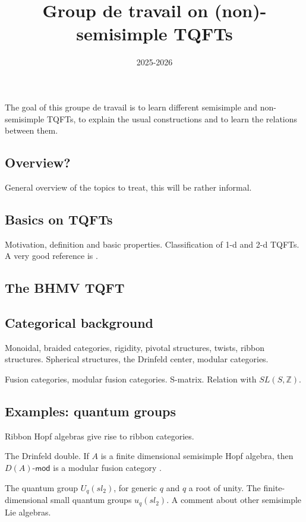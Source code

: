 \documentclass{article}
\title{Group de travail on (non)-semisimple TQFTs}
\date{2025-2026}
\begin{document}
\maketitle

The goal of this groupe de travail is to learn different semisimple and non-semisimple TQFTs, to explain the usual constructions and to learn the  relations between them.


\subsection{Overview?}

General overview of the topics to treat, this will be rather informal.


\subsection{Basics on TQFTs}

Motivation, definition and basic properties. Classification of 1-d and 2-d TQFTs. A very good reference is \cite{CR}.


\subsection{The BHMV TQFT}

\cite{BHMV}


\subsection{Categorical background}


Monoidal, braided categories, rigidity, pivotal structures, twists, ribbon structures. Spherical structures, the Drinfeld center, modular categories.

Fusion categories, modular fusion categories. S-matrix. Relation with $SL(S, \mathbb{Z})$.


\subsection{Examples: quantum groups}

Ribbon Hopf algebras give rise to ribbon categories.

The Drinfeld double. If $A$ is a finite dimensional semisimple Hopf algebra, then $D(A)$-$\mathsf{mod}$ is a modular fusion category \cite{EG}. 

The quantum group $U_q(sl_2)$, for generic $q$ and $q$ a root of unity. The finite-dimensional small quantum groups $u_q(sl_2)$. A comment about other semisimple Lie algebras.
\end{document}
